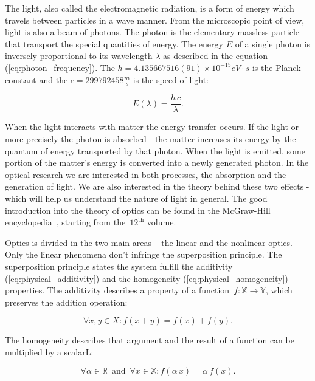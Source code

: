 \documentclass[12pt,twoside,a4paper]{article}
\numberwithin{equation}{subsection}
\numberwithin{figure}{subsection}
\begin{document}
The light, also called the electromagnetic radiation, is a form of energy which travels between particles in a wave manner. From the microscopic point of view, light is also a beam of photons. The photon is the elementary massless particle that transport the special quantities of energy. The energy $E$ of a single photon is inversely proportional to its wavelength $\lambda$ as described in the equation (\ref{eq:photon_frequency}). The $h = 4.135667516(91) \times 10^{-15} eV \cdot s$ is the Planck constant and the $c = 299792458 \frac{m}{s}$ is the speed of light:

\begin{equation} \label{eq:photon_frequency}
	E(\lambda) = \frac {h\,c} {\lambda}.
\end{equation}

When the light interacts with matter the energy transfer occurs. If the light or more precisely the photon is absorbed - the matter increases its energy by the quantum of energy transported by that photon. When the light is emitted, some portion of the matter's energy is converted into a newly generated photon. In the optical research we are interested in both processes, the absorption and the generation of light. We are also interested in the theory behind these two effects - which will help us understand the nature of light in general. The good introduction into the theory of optics can be found in the McGraw-Hill encyclopedia~\cite{mcgraw_encyclopedia}, starting from the~$ 12^{\text{th}} $ volume.

Optics is divided in the two main areas -- the linear and the nonlinear optics. Only the linear phenomena don't infringe the superposition principle. The superposition principle states the system fulfill the additivity (\ref{eq:physical_additivity}) and the homogeneity (\ref{eq:physical_homogeneity}) properties. The additivity describes a property of a function~$ f : \mathbb{X} \to \mathbb{Y}$, which preserves the addition operation:

\begin{equation} \label{eq:physical_additivity}
  \forall x, y \in X : f(x + y) = f(x) + f(y) .
\end{equation}

The homogeneity describes that argument and the result of a function can be multiplied by a scalarL:

\begin{equation} \label{eq:physical_homogeneity}
  \forall \alpha \in \mathbb{R} \, \text{ and } \, \forall x \in \mathbb{X} : f(\alpha \, x) = \alpha \, f(x) .
\end{equation}
\end{document}
